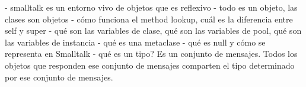 - smalltalk es un entorno vivo de objetos que es reflexivo
- todo es un objeto, las clases son objetos
- cómo funciona el method lookup, cuál es la diferencia entre self y super
- qué son las variables de clase, qué son las variables de pool, qué son las variables de instancia
- qué es una metaclase
- qué es null y cómo se representa en Smalltalk
- qué es un tipo? Es un conjunto de mensajes. Todos los objetos que responden ese conjunto de mensajes
comparten el tipo determinado por ese conjunto de mensajes.